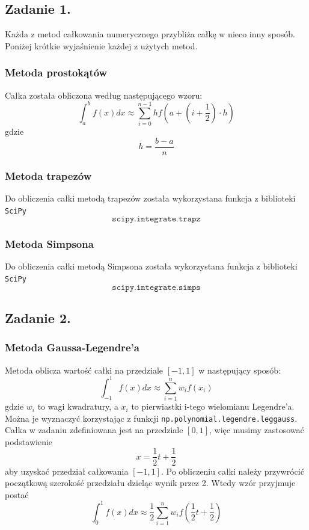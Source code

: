 \documentclass[11pt]{scrartcl}
\begin{document}
    \subsection{Zadanie 1.}
    Każda z metod całkowania numerycznego przybliża całkę w nieco
    inny sposób. Poniżej krótkie wyjaśnienie każdej z użytych
    metod.
    \subsubsection{Metoda prostokątów}
    Całka została obliczona według następującego wzoru:
    \[
        \int_{a}^{b}f(x)dx \approx \sum_{i=0}^{n-1}hf
        \left( a+ \left( i+\frac{1}{2} \right) \cdot h \right)
    \]
    gdzie
    \[
        h=\frac{b-a}{n}
    \]

    \subsubsection{Metoda trapezów}
    Do obliczenia całki metodą trapezów została wykorzystana funkcja
    z biblioteki \texttt{SciPy}
    \[
        \texttt{scipy.integrate.trapz}
    \]
    \subsubsection{Metoda Simpsona}
    Do obliczenia całki metodą Simpsona została wykorzystana funkcja
    z biblioteki \texttt{SciPy}
    \[
        \texttt{scipy.integrate.simps}
    \]

    \subsection{Zadanie 2.}
    \subsubsection{Metoda Gaussa-Legendre'a}
    Metoda oblicza wartość całki na przedziale $[-1,1]$
    w następujący sposób:
    \[
        \int_{-1}^{1}f(x)dx \approx \sum_{i=1}^{n}w_if(x_i)
    \]
    gdzie $w_i$ to wagi kwadratury, a $x_i$ to pierwiastki
    i-tego wielomianu Legendre'a. Można je wyznaczyć korzystając
    z funkcji \texttt{np.polynomial.legendre.leggauss}. \\
    Całka w zadaniu zdefiniowana jest na przedziale $[0,1]$, więc
    musimy zastosować podstawienie
    \[
        x=\frac{1}{2}t+\frac{1}{2}
    \]
    aby uzyskać przedział całkowania $[-1,1]$. Po obliczeniu całki
    należy przywrócić początkową szerokość przedziału dzieląc wynik
    przez 2. Wtedy wzór przyjmuje postać
    \[
        \int_{0}^{1}f(x)dx \approx \frac{1}{2}\sum_{i=1}^{n}w_i
            f \left( \frac{1}{2}t+\frac{1}{2} \right)
    \]
\end{document}
